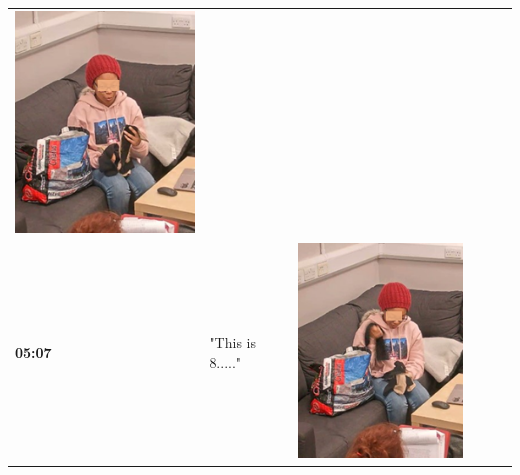 \documentclass[twocolumn, issue, empirical, authordate,drafn]{jote-new-article}
\begin{document}
\begin{table}[ht!]
\begin{tabularx}{\linewidth}{@{} m{.05\linewidth} m{.2\linewidth} >{\raggedleft\arraybackslash}m{.19\linewidth}  m{.05\linewidth} m{.2\linewidth} >{\raggedleft\arraybackslash}m{.19\linewidth} }
\includegraphics[height=.15\textheight, width=.8\linewidth]{media/image10.png}  \\
 \textbf{05:07} & "This is 8....." & \includegraphics[height=.15\textheight, width=.8\linewidth]{media/image6.png} &

\end{tabularx}
\end{table}
\end{document}

